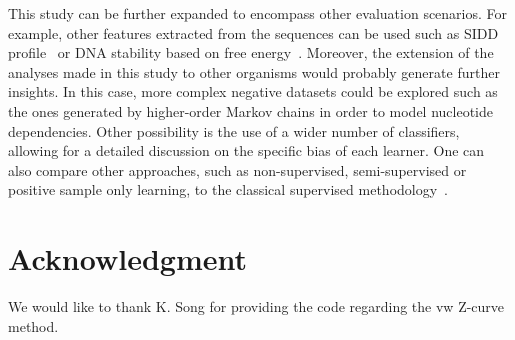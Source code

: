 \documentclass[conference]{IEEEtran}
\begin{document}
This study can be further expanded to encompass other evaluation scenarios. For example, other features extracted from the sequences can be used such as SIDD profile~\cite{bland2010} or DNA stability based on free energy~\cite{avila2011}. Moreover, the extension of the analyses made in this study to other organisms would probably generate further insights. In this case, more complex negative datasets could be explored such as the ones generated by higher-order Markov chains in order to model nucleotide dependencies. Other possibility is the use of a wider number of classifiers, allowing for a detailed discussion on the specific bias of each learner. One can also compare other approaches, such as non-supervised, semi-supervised or positive sample only learning, to the classical supervised methodology~\cite{cerulo2010,wang2006,yousef2008}.

\section*{Acknowledgment}
We would like to thank K. Song for providing the code regarding the vw Z-curve method.

\def\V{\rm vol.~}
\def\N{no.~}
\def\pp{pp.~}
\def\Pot{\it Proc. }
\def\IJCNN{\it International Joint Conference on Neural Networks\rm }
\def\ACC{\it American Control Conference\rm }
\def\SMC{\it IEEE Trans. Systems\rm , \it Man\rm , and \it Cybernetics\rm }
\def\handb{ \it Handbook of Intelligent Control: Neural\rm , \it
    Fuzzy\rm , \it and Adaptive Approaches \rm }



\end{document}
